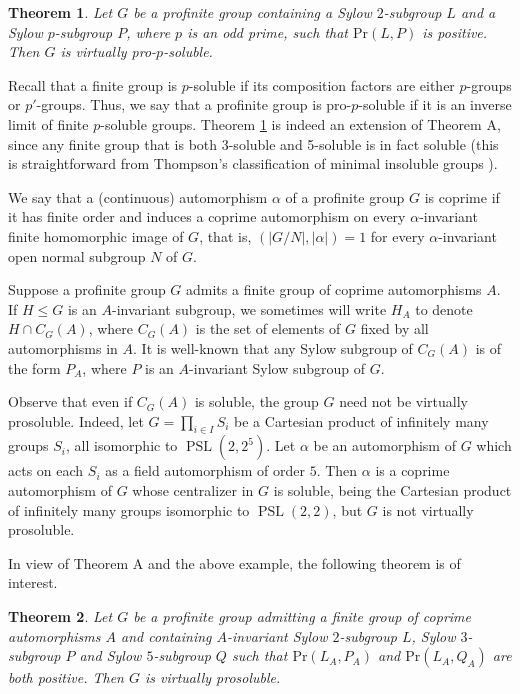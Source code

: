 \documentclass[12pt]{amsart}
\newtheorem{theorem}{\bf Theorem}[section]
\newcommand{\al }{\alpha }
\newcommand{\pr }{\mathrm{Pr} }
\DeclareMathOperator{\PSL}{PSL}
\begin{document}
\begin{theorem}\label{main1}
 Let $G$ be a profinite group containing a Sylow $2$-subgroup $L$ and a Sylow $p$-subgroup  $P$, where $p$ is an odd prime, 
  such that $\pr(L,P)$ is positive. Then $G$ is virtually pro-$p$-soluble.
\end{theorem}

Recall that a finite group is $p$-soluble if its composition factors are either $p$-groups or $p'$-groups. Thus, we say that a profinite group is pro-$p$-soluble if it is an inverse limit of finite $p$-soluble groups. Theorem \ref{main1} is indeed an extension of Theorem A, since any finite group that is both 3-soluble and 5-soluble is in fact soluble (this is straightforward from Thompson's classification of minimal insoluble groups \cite{thompson}).

We say that a (continuous) automorphism $\al$ of a profinite group $G$ is coprime if it has finite order and induces a coprime automorphism on every $\al$-invariant finite homomorphic image of $G$, that is, $(|G/N|,|\alpha|) = 1$ for every $\al$-invariant open normal subgroup $N$ of $G$.

Suppose a profinite group $G$ admits a finite group of coprime automorphisms $A$. 
If $H\leq G$ is an $A$-invariant subgroup, we sometimes will write $H_A$ to denote $H \cap C_G(A)$, 
 where $C_G(A)$ is the set of elements of $G$ fixed by all automorphisms in $A$. 
 It is well-known that any Sylow subgroup of $C_G(A)$ is of the form $P_A$, where $P$ is an $A$-invariant Sylow subgroup of $G$. 

Observe that even if $C_G(A)$ is soluble, the group $G$ need not be virtually prosoluble. Indeed, let $G=\prod_{i\in I} S_i$ be a Cartesian product of infinitely many groups $S_i$, all isomorphic to $\PSL(2,2^5)$. Let $\alpha$ be an automorphism of $G$ which acts on each $S_i$ as  a field automorphism  of order $5$. Then $\alpha$ is a coprime automorphism of $G$ whose centralizer in $G$ is soluble, being the Cartesian product of infinitely many groups isomorphic to $\PSL(2,2)$, but $G$ is not virtually prosoluble.

In view of Theorem A and the above example, the following theorem is of interest. 

\begin{theorem}\label{main2} Let $G$ be a profinite group admitting a finite group of coprime automorphisms $A$ and containing $A$-invariant Sylow $2$-subgroup $L$, Sylow $3$-subgroup $P$ and Sylow $5$-subgroup $Q$ such that $\pr(L_A,P_A)$ and $\pr(L_A,Q_A)$ are both positive. Then $G$ is virtually prosoluble.
\end{theorem}
\end{document}
